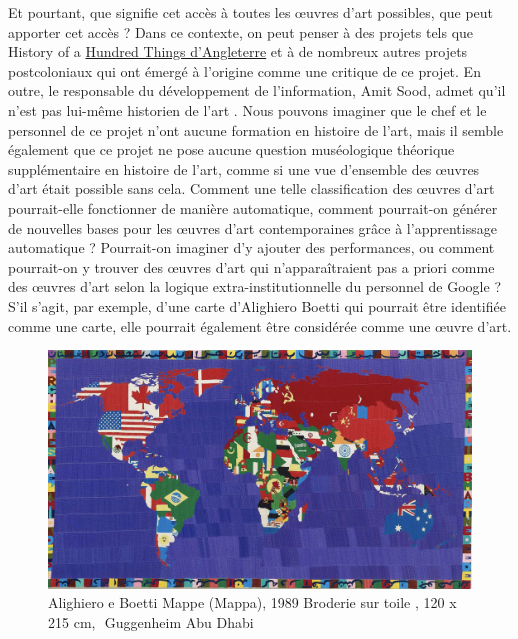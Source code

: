 \documentclass[a4paper, twoside, 12pt]{book}
\begin{document}
Et pourtant, que signifie cet accès à toutes les œuvres d'art possibles, que peut apporter cet accès ? Dans ce contexte, on peut penser à des projets tels que History of a \hyperlink{ https://www.bbc.co.uk/ahistoryoftheworld/about/british-museum-objects/}{Hundred Things d'Angleterre} et à de nombreux autres projets postcoloniaux qui ont émergé à l'origine comme une critique de ce projet. En outre, le responsable du développement de l'information, Amit Sood, admet qu'il n'est pas lui-même historien de l'art \cite{Pifsterer, U. (2018) Big Bang Art History, International Journal for Digital Art History, no. 3 (juillet)}. Nous pouvons imaginer que le chef et le personnel de ce projet n'ont aucune formation en histoire de l'art, mais il semble également que ce projet ne pose aucune question muséologique théorique supplémentaire en histoire de l'art, comme si une vue d'ensemble des œuvres d'art était possible sans cela. Comment une telle classification des œuvres d'art pourrait-elle fonctionner de manière automatique, comment pourrait-on générer de nouvelles bases pour les œuvres d'art contemporaines grâce à l'apprentissage automatique ? Pourrait-on imaginer d'y ajouter des performances, ou comment pourrait-on y trouver des œuvres d'art qui n'apparaîtraient pas a priori comme des œuvres d'art selon la logique extra-institutionnelle du personnel de Google ? S'il s'agit, par exemple, d'une carte d'Alighiero Boetti qui pourrait être identifiée comme une carte, elle pourrait également être considérée comme une œuvre d'art. \\

\begin{figure}
    \centering
    \includegraphics[width=1\linewidth]{image.png}
    \caption{Alighiero e Boetti Mappe (Mappa), 1989 Broderie sur toile , 120 x 215 cm,  Guggenheim Abu Dhabi
}
    \label{fig:enter-label}
\end{figure}
\end{document}
